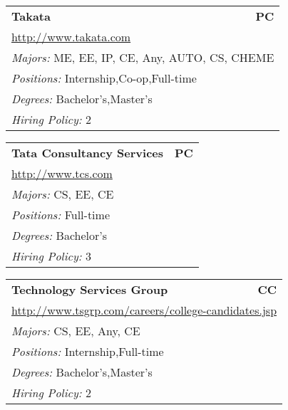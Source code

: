 \documentclass[twoside]{article}
\begin{document}
\begin{center}
\begin{multicols}{3}
\begin{FlushLeft}
\begin{minipage}{\columnwidth}
\end{minipage}
 
\begin{minipage}{\columnwidth}\begin{tabularx}{.95\columnwidth}{Xr}
                 {\Large\bf Takata} & {\Large\bf PC}\\
    \multicolumn{2}{p{.95\columnwidth}}{\url{http://www.takata.com}}\\
    \multicolumn{2}{p{.95\columnwidth}}{\emph{Majors:} ME, EE, IP, CE, Any, AUTO, CS, CHEME}\\
    \multicolumn{2}{p{.95\columnwidth}}{\emph{Positions:} Internship,Co-op,Full-time}\\
    \multicolumn{2}{p{.95\columnwidth}}{\emph{Degrees:} Bachelor's,Master's}\\
    \multicolumn{2}{p{.95\columnwidth}}{\emph{Hiring Policy:} 2}\\
    \end{tabularx}
    
\end{minipage}
 
\begin{minipage}{\columnwidth}\begin{tabularx}{.95\columnwidth}{Xr}
                 {\Large\bf Tata Consultancy Services} & {\Large\bf PC}\\
    \multicolumn{2}{p{.95\columnwidth}}{\url{http://www.tcs.com}}\\
    \multicolumn{2}{p{.95\columnwidth}}{\emph{Majors:} CS, EE, CE}\\
    \multicolumn{2}{p{.95\columnwidth}}{\emph{Positions:} Full-time}\\
    \multicolumn{2}{p{.95\columnwidth}}{\emph{Degrees:} Bachelor's}\\
    \multicolumn{2}{p{.95\columnwidth}}{\emph{Hiring Policy:} 3}\\
    \end{tabularx}
    
\end{minipage}
 
\begin{minipage}{\columnwidth}\begin{tabularx}{.95\columnwidth}{Xr}
                 {\Large\bf Technology Services Group} & {\Large\bf CC}\\
    \multicolumn{2}{p{.95\columnwidth}}{\url{http://www.tsgrp.com/careers/college-candidates.jsp}}\\
    \multicolumn{2}{p{.95\columnwidth}}{\emph{Majors:} CS, EE, Any, CE}\\
    \multicolumn{2}{p{.95\columnwidth}}{\emph{Positions:} Internship,Full-time}\\
    \multicolumn{2}{p{.95\columnwidth}}{\emph{Degrees:} Bachelor's,Master's}\\
    \multicolumn{2}{p{.95\columnwidth}}{\emph{Hiring Policy:} 2}\\
    \end{tabularx}
    

\end{minipage}
\end{FlushLeft}
\end{multicols}
\end{center}
\end{document}
